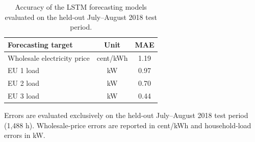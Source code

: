 \begin{table}[H]
\centering
\caption{Accuracy of the LSTM forecasting models evaluated on the held-out July--August 2018 test period.}
\label{tab:forecast_accuracy}
\small
\begin{tabular}{lcc}
\hline
\textbf{Forecasting target} & \textbf{Unit} & \textbf{MAE} \\
\hline
Wholesale electricity price & cent/kWh & 1.19 \\
EU 1 load & kW & 0.97 \\
EU 2 load & kW & 0.70 \\
EU 3 load & kW & 0.44 \\
\hline
\end{tabular}
\vspace{2pt}
\begin{minipage}{0.92\columnwidth}
\footnotesize
Errors are evaluated exclusively on the held-out July--August 2018 test period (1,488 h). Wholesale-price errors are reported in cent/kWh and household-load errors in kW.
\end{minipage}
\end{table}